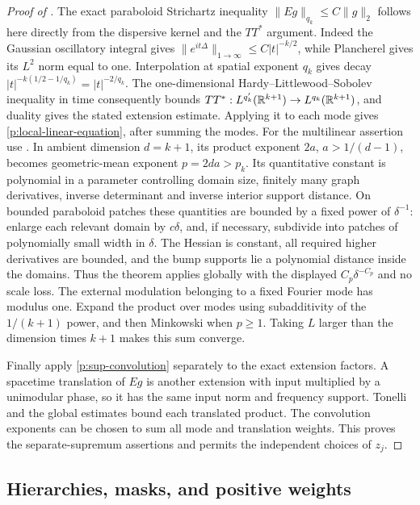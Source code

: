 \begin{proof}[Proof of ]
The exact paraboloid Strichartz inequality
$\|Eg\|_{q_k}\leq C\|g\|_2$ follows here directly from the dispersive
kernel and the $TT^*$ argument.  Indeed the Gaussian oscillatory integral
gives $\|e^{it\Delta}\|_{1\to\infty}\leq C|t|^{-k/2}$, while Plancherel
gives its $L^2$ norm equal to one.  Interpolation at spatial exponent $q_k$
gives decay $|t|^{-k(1/2-1/q_k)}=|t|^{-2/q_k}$.
The one-dimensional Hardy--Littlewood--Sobolev inequality in time consequently
bounds $TT^*:L^{q_k'}(\mathbb R^{k+1})\to L^{q_k}(\mathbb R^{k+1})$, and duality gives
the stated extension estimate.  Applying it to each mode gives
\eqref{p:local-linear-equation}, after summing the modes.
For the multilinear assertion use \citet[Theorem~1.7]{Tao2020}.
In ambient dimension $d=k+1$, its product exponent $2a$, $a>1/(d-1)$,
becomes geometric-mean exponent $p=2da>p_k$.
Its quantitative constant is polynomial in a parameter controlling domain
size, finitely many graph derivatives, inverse determinant and inverse
interior support distance.  On bounded paraboloid patches these quantities
are bounded by a fixed power of $\delta^{-1}$: enlarge each relevant domain
by $c\delta$, and, if necessary, subdivide into patches of polynomially small
width in $\delta$.  The Hessian is constant, all required higher derivatives
are bounded, and the bump supports lie a polynomial distance inside the
domains.  Thus the theorem applies globally with the displayed
$C_p\delta^{-C_p}$ and no scale loss.
The external modulation belonging to a fixed Fourier mode has modulus one.
Expand the product over modes using subadditivity of the $1/(k+1)$ power,
and then Minkowski when $p\geq1$.  Taking $L$ larger than the dimension
times $k+1$ makes this sum converge.

Finally apply \eqref{p:sup-convolution} separately to the exact extension
factors.  A spacetime translation of $Eg$ is another extension with input
multiplied by a unimodular phase, so it has the same input norm and frequency
support.  Tonelli and the global estimates bound each translated product.
The convolution exponents can be chosen to sum all mode and translation
weights.  This proves the separate-supremum assertions and permits the
independent choices of $z_j$.
\end{proof}

\subsection{Hierarchies, masks, and positive weights}

